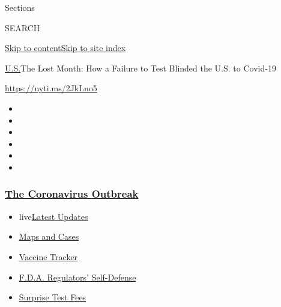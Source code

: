 Sections

SEARCH

\protect\hyperlink{site-content}{Skip to
content}\protect\hyperlink{site-index}{Skip to site index}

\href{/section/us}{U.S.}\textbar{}The Lost Month: How a Failure to Test
Blinded the U.S. to Covid-19

\url{https://nyti.ms/2JkLno5}

\begin{itemize}
\item
\item
\item
\item
\item
\item
\end{itemize}

\hypertarget{the-coronavirus-outbreak}{%
\subsubsection{\texorpdfstring{\href{https://www.nytimes3xbfgragh.onion/news-event/coronavirus?name=styln-coronavirus-national\&region=TOP_BANNER\&block=storyline_menu_recirc\&action=click\&pgtype=Article\&impression_id=328af5c0-f4bf-11ea-ad38-030638cf0afc\&variant=undefined}{The
Coronavirus
Outbreak}}{The Coronavirus Outbreak}}\label{the-coronavirus-outbreak}}

\begin{itemize}
\tightlist
\item
  live\href{https://www.nytimes3xbfgragh.onion/2020/09/11/world/covid-19-coronavirus.html?name=styln-coronavirus-national\&region=TOP_BANNER\&block=storyline_menu_recirc\&action=click\&pgtype=Article\&impression_id=328af5c1-f4bf-11ea-ad38-030638cf0afc\&variant=undefined}{Latest
  Updates}
\item
  \href{https://www.nytimes3xbfgragh.onion/interactive/2020/us/coronavirus-us-cases.html?name=styln-coronavirus-national\&region=TOP_BANNER\&block=storyline_menu_recirc\&action=click\&pgtype=Article\&impression_id=328af5c2-f4bf-11ea-ad38-030638cf0afc\&variant=undefined}{Maps
  and Cases}
\item
  \href{https://www.nytimes3xbfgragh.onion/interactive/2020/science/coronavirus-vaccine-tracker.html?name=styln-coronavirus-national\&region=TOP_BANNER\&block=storyline_menu_recirc\&action=click\&pgtype=Article\&impression_id=328b1cd0-f4bf-11ea-ad38-030638cf0afc\&variant=undefined}{Vaccine
  Tracker}
\item
  \href{https://www.nytimes3xbfgragh.onion/2020/09/10/us/politics/fda-coronavirus-vaccine.html?name=styln-coronavirus-national\&region=TOP_BANNER\&block=storyline_menu_recirc\&action=click\&pgtype=Article\&impression_id=328b1cd1-f4bf-11ea-ad38-030638cf0afc\&variant=undefined}{F.D.A.
  Regulators' Self-Defense}
\item
  \href{https://www.nytimes3xbfgragh.onion/2020/09/09/upshot/coronavirus-surprise-test-fees.html?name=styln-coronavirus-national\&region=TOP_BANNER\&block=storyline_menu_recirc\&action=click\&pgtype=Article\&impression_id=328b1cd2-f4bf-11ea-ad38-030638cf0afc\&variant=undefined}{Surprise
  Test Fees}
\end{itemize}

